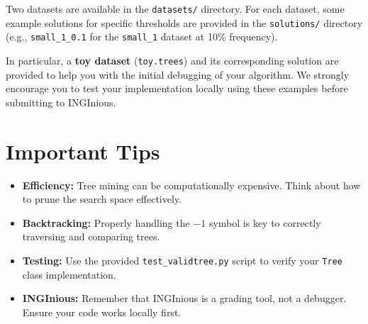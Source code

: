 \documentclass[]{article}
\begin{document}
Two datasets are available in the \texttt{datasets/} directory. For each dataset, some example solutions for specific thresholds are provided in the \texttt{solutions/} directory (e.g., \texttt{small\_1\_0.1} for the \texttt{small\_1} dataset at 10\% frequency).

In particular, a \textbf{toy dataset} (\texttt{toy.trees}) and its corresponding solution are provided to help you with the initial debugging of your algorithm. We strongly encourage you to test your implementation locally using these examples before submitting to INGInious.

\section{Important Tips}

\begin{itemize}
    \item \textbf{Efficiency:} Tree mining can be computationally expensive. Think about how to prune the search space effectively.
    \item \textbf{Backtracking:} Properly handling the $-1$ symbol is key to correctly traversing and comparing trees.
    \item \textbf{Testing:} Use the provided \texttt{test\_validtree.py} script to verify your \texttt{Tree} class implementation.
    \item \textbf{INGInious:} Remember that INGInious is a grading tool, not a debugger. Ensure your code works locally first.
\end{itemize}
\end{document}
